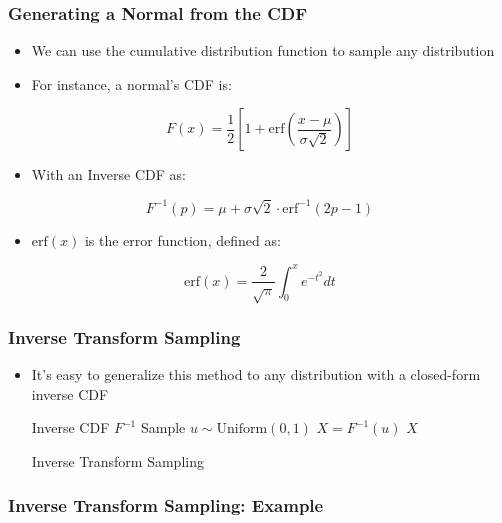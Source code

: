 \documentclass{beamer}
\begin{document}
\begin{frame}
\frametitle{Generating a Normal from the CDF}
\begin{itemize}
  \item We can use the cumulative distribution function to sample any distribution
  \item For instance, a normal's CDF is:
\end{itemize}
\begin{equation*}
  F(x) = \frac{1}{2} \left[ 1 + \text{erf}\left( \frac{x - \mu}{\sigma \sqrt{2}} \right) \right]
\end{equation*}
\begin{itemize}
  \item With an Inverse CDF as:
\end{itemize}
\begin{equation*}
  F^{-1}(p) = \mu + \sigma \sqrt{2} \cdot \text{erf}^{-1}\left( 2p - 1 \right)
\end{equation*}
\begin{itemize}
  \item $\text{erf}(x)$ is the error function, defined as:
\end{itemize}
\begin{equation*}
  \text{erf}(x) = \frac{2}{\sqrt{\pi}} \int^{x}_{0} e^{-t^2} dt
\end{equation*}
\end{frame}


\begin{frame}
\frametitle{Inverse Transform Sampling}
\begin{itemize}
  \item It's easy to generalize this method to any distribution with a closed-form inverse CDF
  \begin{algorithm}[H]
  \begin{algorithmic}[1]
    \REQUIRE Inverse CDF $F^{-1}$
    \STATE Sample $u \sim \text{Uniform}(0, 1)$
    \STATE $X = F^{-1} (u)$
    \ENSURE $X$
  \end{algorithmic}
  \caption{Inverse Transform Sampling}
  \end{algorithm}
\end{itemize}

\end{frame}


\begin{frame}
\frametitle{Inverse Transform Sampling: Example}
\end{frame}
\end{document}
